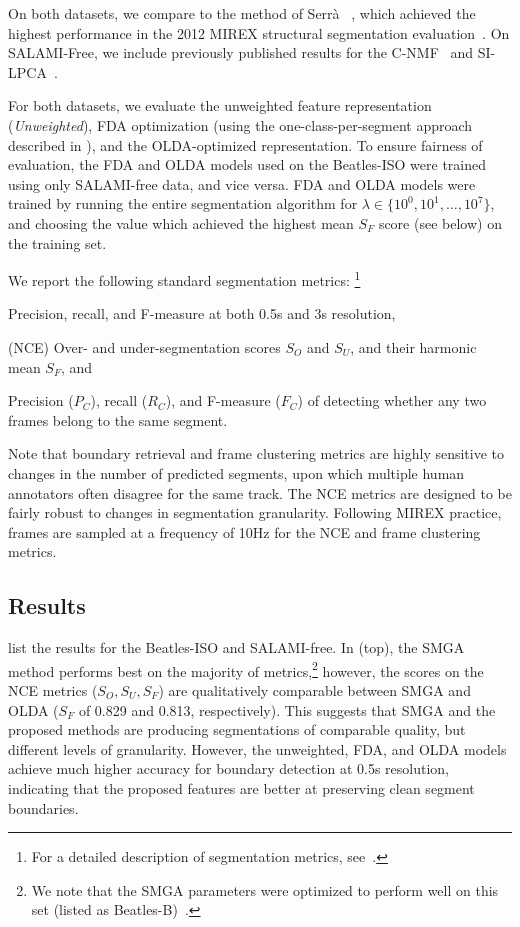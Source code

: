 \documentclass{article}
\begin{document}
On both datasets, we compare to the method of Serr\`{a} \etal~\cite{serra2012unsupervised}, which achieved the
highest performance in the 2012 MIREX structural segmentation evaluation~\cite{Downie2008}.
On SALAMI-Free, we include previously published results for the C-NMF~\cite{nieto2013convex} and SI-LPCA~\cite{weiss2011unsupervised}.

For both datasets, we evaluate the unweighted feature representation (\emph{Unweighted}), FDA optimization (using the
one-class-per-segment approach described in ), and the OLDA-optimized
representation. To ensure fairness of evaluation, the FDA and OLDA models used on the Beatles-ISO were trained using only
SALAMI-free data, and vice versa.  FDA and OLDA models were trained by running the entire segmentation algorithm for
$\lambda \in \{10^0, 10^1, \dots, 10^7\}$, and choosing the value which achieved the highest mean $S_F$ score (see below) on 
the training set.


We report the following standard segmentation metrics:
\footnote{For a detailed description of segmentation metrics, see~\cite{mirexstructure}.}
\begin{description}\addtolength{\itemsep}{-0.25\baselineskip}%
\item[Boundary retrieval] Precision, recall, and F-measure at both 0.5s and 3s resolution,
\item[Normalized conditional entropy] (NCE) Over- and under-segmentation scores $S_O$ and $S_U$, and their harmonic
mean $S_F$, and
\item[Frame clustering] Precision ($P_C$), recall ($R_C$), and F-measure ($F_C$) of detecting whether any two frames 
belong to the same segment.
\end{description}
Note that boundary retrieval and frame clustering metrics are highly sensitive to changes in the number of
predicted segments, upon which multiple human annotators often disagree for the same track. 
The NCE metrics are designed to be fairly robust to changes in segmentation granularity.
Following MIREX practice, frames are sampled at a frequency of 10Hz for the NCE and frame clustering metrics. 


\subsection{Results}
\label{sec:results}

 list the results for the Beatles-ISO and SALAMI-free.
In  (top), the SMGA method performs best on the majority of metrics,\footnote{We
note that the SMGA parameters were optimized to perform well on this set (listed as
Beatles-B)~\cite{serra2012unsupervised}.}
however, the scores on the NCE metrics ($S_O, S_U, S_F$) are qualitatively comparable between SMGA and OLDA ($S_F$ of 0.829
and 0.813, respectively). 
This suggests that SMGA and the proposed methods are producing segmentations of comparable quality, but 
different levels of granularity.
However, the unweighted, FDA, and OLDA models achieve much higher accuracy for boundary detection at 0.5s resolution,
indicating that the proposed features are better at preserving clean segment boundaries.  
\end{document}
